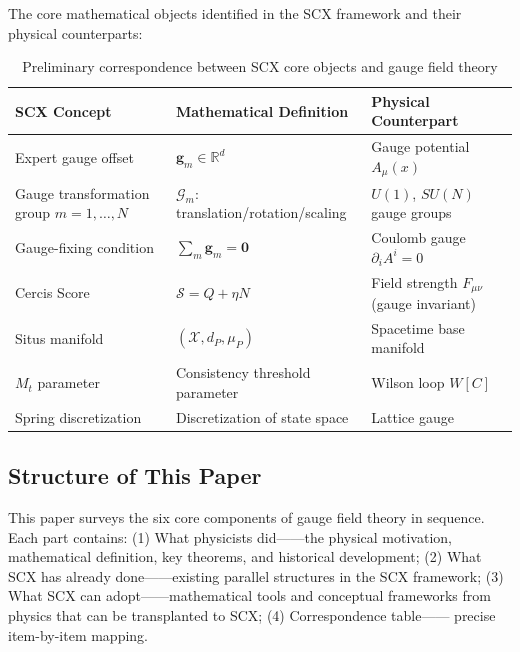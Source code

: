 \documentclass[12pt,a4paper]{article}
\theoremstyle{remark}
\newcommand{\R}{\mathbb{R}}
\newcommand{\CercisScore}{\mathcal{S}}
\newcommand{\gaugeparam}{\mathbf{g}}
\newcommand{\calG}{\mathcal{G}}
\begin{document}
\medskip
The core mathematical objects identified in the SCX framework and their physical counterparts:

\begin{table}[H]
\centering
\caption{Preliminary correspondence between SCX core objects and gauge field theory}
\label{tab:preliminary}
\begin{tabular}{p{4cm} p{4.5cm} p{4.5cm}}
\toprule
\textbf{SCX Concept} & \textbf{Mathematical Definition} & \textbf{Physical Counterpart} \\
\midrule
Expert gauge offset & $\gaugeparam_m \in \R^d$ & Gauge potential $A_\mu(x)$ \\
\makecell{Gauge transformation group \\ $m=1,\ldots,N$} & $\calG_m$: translation/rotation/scaling & $U(1)$, $SU(N)$ gauge groups \\
Gauge-fixing condition & $\sum_m \gaugeparam_m = \mathbf{0}$ & Coulomb gauge $\partial_i A^i = 0$ \\
Cercis Score & $\CercisScore = Q + \eta N$ & Field strength $F_{\mu\nu}$ (gauge invariant) \\
Situs manifold & $(\mathcal{X}, d_P, \mu_P)$ & Spacetime base manifold \\
$M_t$ parameter & Consistency threshold parameter & Wilson loop $W[C]$ \\
Spring discretization & Discretization of state space & Lattice gauge \\
\bottomrule
\end{tabular}
\end{table}

\subsection{Structure of This Paper}

This paper surveys the six core components of gauge field theory in sequence.
Each part contains: (1) What physicists did——the physical motivation, mathematical definition,
key theorems, and historical development; (2) What SCX has already done——existing parallel
structures in the SCX framework; (3) What SCX can adopt——mathematical tools and conceptual
frameworks from physics that can be transplanted to SCX; (4) Correspondence table——
precise item-by-item mapping.

\newpage

\end{document}
